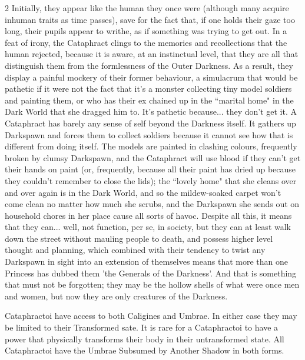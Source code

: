 \begin{multicols}{2}
Initially, they appear like the human they once were (although many acquire inhuman traits as time passes), save for the fact that, if one holds their gaze too long, their pupils appear to writhe, as if something was trying to get out. In a feat of irony, the Cataphract clings to the memories and recollections that the human rejected, because it is aware, at an instinctual level, that they are all that distinguish them from the formlessness of the Outer Darkness. As a result, they display a painful mockery of their former behaviour, a simulacrum that would be pathetic if it were not the fact that it's a monster collecting tiny model soldiers and painting them, or who has their ex chained up in the \textquotedblleft marital home" in the Dark World that she dragged him to. It's pathetic because... they don't get it. A Cataphract has barely any sense of self beyond the Darkness itself. It gathers up Darkspawn and forces them to collect soldiers because it cannot see how that is different from doing itself. The 
models are painted in clashing colours, frequently broken by clumsy Darkspawn, and the Cataphract will use blood if they can't get their hands on paint (or, frequently, because all their paint has dried up because they couldn't remember to close the lids); the \textquotedblleft lovely home" that she cleans over and over again is in the Dark World, and so the mildew-soaked carpet won't come clean no matter how much she scrubs, and the Darkspawn she sends out on household chores in her place cause all sorts of havoc. Despite all this, it means that they can... well, not function, per se, in society, but they can at least walk down the street without mauling people to death, and possess higher level thought and planning, which combined with their tendency to twist any Darkspawn in sight into an extension of themselves means that more than one Princess has dubbed them 'the Generals of the Darkness'. And that is something that must not be forgotten; they may be the hollow shells of what were once men and women, 
but now they are only creatures of the Darkness.

Cataphractoi have access to both Caligines and Umbrae. In either case they may be limited to their Transformed sate. It is rare for a Cataphractoi to have a power that physically transforms their body in their untransformed state. All Cataphractoi have the Umbrae Subsumed by Another Shadow in both forms. 


\end{multicols}
